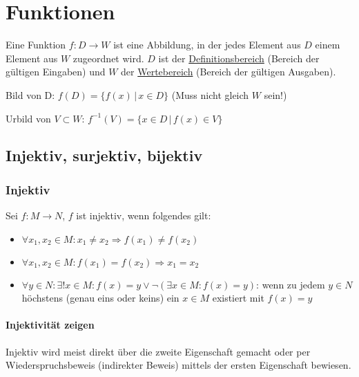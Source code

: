 \section{Funktionen}
Eine Funktion $f: D \rightarrow W$ ist eine Abbildung, in der jedes Element aus
$D$ einem Element aus $W$ zugeordnet wird. $D$ ist der \underline{Definitionsbereich}
(Bereich der gültigen Eingaben) und $W$ der \underline{Wertebereich}
(Bereich der gültigen Ausgaben).

Bild von D: $f(D) = \{ f(x) \, | \, x \in D \}$ (Muss nicht gleich $W$ sein!)

Urbild von $V \subset W$: $f^{-1}(V) = \{ x \in D \, | \, f(x) \in V \}$

\subsection{Injektiv, surjektiv, bijektiv}
\subsubsection{Injektiv}
Sei $f: M \rightarrow N$, $f$ ist injektiv, wenn folgendes gilt:
\begin{itemize}
	\item $\forall x_1, x_2 \in M: x_1 \neq x_2 \Rightarrow f(x_1) \neq f(x_2)$
	\item $\forall x_1, x_2 \in M: f(x_1) = f(x_2) \Rightarrow x_1 = x_2$
	\item $\forall y \in N: \exists !x \in M: f(x) = y \lor \lnot(\exists x \in M: f(x) = y)$: wenn zu jedem $y \in N$ höchstens (genau eins oder keins) ein $x \in M$ existiert mit $f(x) = y$
\end{itemize}


\paragraph{Injektivität zeigen}
Injektiv wird meist direkt über die zweite Eigenschaft gemacht oder per Wiederspruchsbeweis (indirekter Beweis) mittels der ersten Eigenschaft bewiesen.

